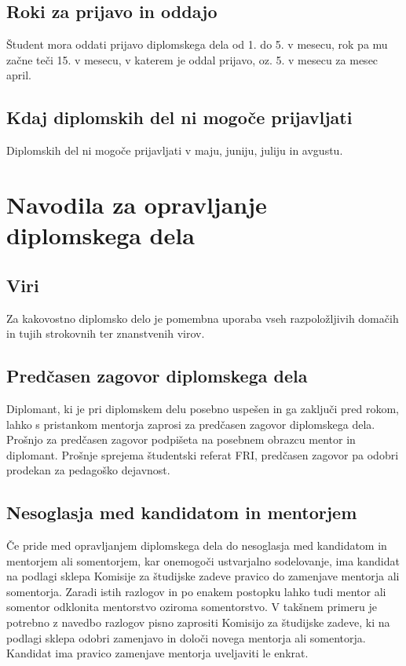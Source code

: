 \documentclass[12pt,a4paper]{book}
\begin{document}
\section{Roki za prijavo in oddajo} 
Študent mora oddati prijavo diplomskega dela od 1. do 5. v mesecu, rok pa mu začne teči 15. v mesecu, 
v katerem je oddal prijavo, oz. 5. v mesecu za mesec april.

\section{Kdaj diplomskih del ni mogoče prijavljati} 
Diplomskih del ni mogoče prijavljati v maju, juniju, juliju in avgustu.



\chapter{Navodila za opravljanje diplomskega dela}

\section{Viri}
Za kakovostno diplomsko delo je pomembna uporaba vseh razpoložljivih doma\-čih in tujih strokovnih ter znanstvenih virov.

\section{Predčasen zagovor diplomskega dela}
Diplomant, ki je pri diplomskem delu posebno uspešen in ga zaključi pred rokom, lahko s pristankom mentorja zaprosi za 
predčasen zagovor diplomskega dela. Prošnjo za predčasen zagovor podpišeta na posebnem obrazcu mentor in diplomant. Prošnje sprejema študentski
referat FRI, predčasen zagovor pa odobri prodekan za pedagoško dejavnost.

\section{Nesoglasja med kandidatom in mentorjem}
Če pride med opravljanjem diplomskega dela do nesoglasja med kandidatom in mentorjem ali somentorjem, 
kar onemogoči ustvarjalno sodelovanje, ima kandidat na podlagi sklepa Komisije za študijske zadeve pravico do zame\-nja\-ve mentorja ali
somentorja. Zaradi istih razlogov in po enakem postopku lahko tudi mentor ali somentor odklonita mentorstvo oziroma somentorstvo. V takšnem
primeru je potrebno z navedbo razlogov pisno zaprositi Komisijo za študijske zadeve, ki na podlagi sklepa odobri zamenjavo in določi novega
mentorja ali somentorja. Kandidat ima pravico zamenjave mentorja uveljaviti le enkrat.
\end{document}
